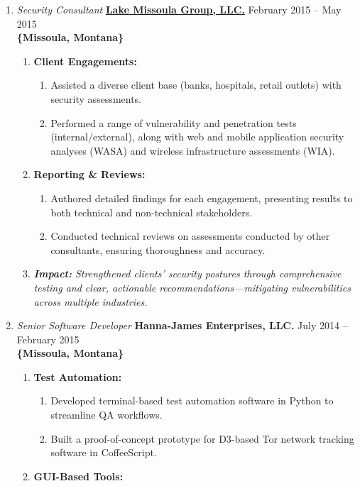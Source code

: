 \documentclass[oneside]{article}%
\begin{document}
\begin{enumerate}[]
\begin{enumerate}[]
	\end{enumerate}
	\item \textit{Security Consultant} \textbf{\href{https://lmgsecurity.com/}{Lake Missoula Group, LLC.}} \hfill February 2015 -- May 2015\\
	\textbf{\{Missoula, Montana\}}
	\begin{enumerate}[]
		\item \textbf{Client Engagements:}
			\begin{enumerate}[-]
				\item Assisted a diverse client base (banks, hospitals, retail outlets) with security assessments.
				\item Performed a range of vulnerability and penetration tests (internal/external), along with web and mobile application security analyses (WASA) and wireless infrastructure assessments (WIA).
			\end{enumerate}
		\item \textbf{Reporting \& Reviews:}
			\begin{enumerate}[-]
				\item Authored detailed findings for each engagement, presenting results to both technical and non-technical stakeholders.
				\item Conducted technical reviews on assessments conducted by other consultants, ensuring thoroughness and accuracy.
			\end{enumerate}
		\item \textit{\textbf{Impact:} Strengthened clients’ security postures through comprehensive testing and clear, actionable recommendations—mitigating vulnerabilities across multiple industries.}
	\end{enumerate}
	\item \textit{Senior Software Developer} \textbf{Hanna-James Enterprises, LLC.} \hfill July 2014 -- February 2015\\
	\textbf{\{Missoula, Montana\}}
	\begin{enumerate}[]
		\item \textbf{Test Automation:}
			\begin{enumerate}[-]
				\item Developed terminal-based test automation software in Python to streamline QA workflows.
				\item Built a proof-of-concept prototype for D3-based Tor network tracking software in CoffeeScript.
			\end{enumerate}
		\item \textbf{GUI-Based Tools:}

\end{enumerate}
\end{enumerate}
\end{document}
